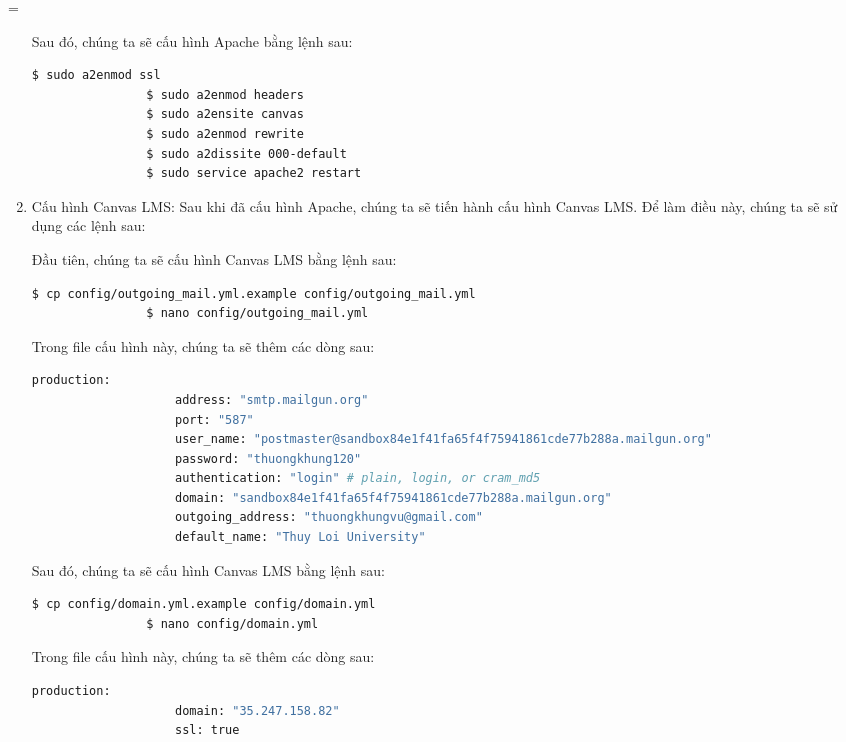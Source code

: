 =\documentclass[../Thesis.tex]{subfiles}
\begin{document}
\begin{enumerate}
            Sau đó, chúng ta sẽ cấu hình Apache bằng lệnh sau:
            \begin{lstlisting}[language=bash]
                $ sudo a2enmod ssl
                $ sudo a2enmod headers
                $ sudo a2ensite canvas
                $ sudo a2enmod rewrite
                $ sudo a2dissite 000-default
                $ sudo service apache2 restart
            \end{lstlisting}

            \item Cấu hình Canvas LMS: Sau khi đã cấu hình Apache, chúng ta sẽ tiến hành cấu hình Canvas LMS. Để làm điều này, chúng ta sẽ sử dụng các lệnh sau:
            
            Đầu tiên, chúng ta sẽ cấu hình Canvas LMS bằng lệnh sau:
            \begin{lstlisting}[language=bash]
                $ cp config/outgoing_mail.yml.example config/outgoing_mail.yml
                $ nano config/outgoing_mail.yml
            \end{lstlisting}

            Trong file cấu hình này, chúng ta sẽ thêm các dòng sau:
            \begin{lstlisting}[language=bash]
                production:
                    address: "smtp.mailgun.org"
                    port: "587"
                    user_name: "postmaster@sandbox84e1f41fa65f4f75941861cde77b288a.mailgun.org"
                    password: "thuongkhung120"
                    authentication: "login" # plain, login, or cram_md5
                    domain: "sandbox84e1f41fa65f4f75941861cde77b288a.mailgun.org"
                    outgoing_address: "thuongkhungvu@gmail.com"
                    default_name: "Thuy Loi University"
            \end{lstlisting}

            Sau đó, chúng ta sẽ cấu hình Canvas LMS bằng lệnh sau:
            \begin{lstlisting}[language=bash]
                $ cp config/domain.yml.example config/domain.yml
                $ nano config/domain.yml
            \end{lstlisting}

            Trong file cấu hình này, chúng ta sẽ thêm các dòng sau:
            \begin{lstlisting}[language=bash]
                production:
                    domain: "35.247.158.82"
                    ssl: true
            \end{lstlisting}


\end{enumerate}
\end{document}
